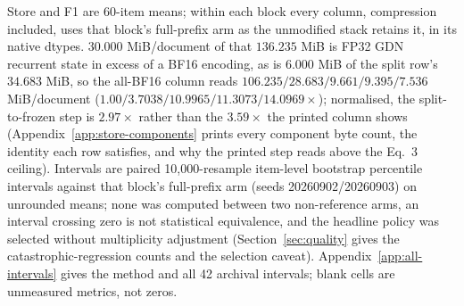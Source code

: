 \begin{table}[t]
\parbox{0.97\textwidth}{\scriptsize Store and F1 are 60-item means; within each block every column,
compression included, uses that block's full-prefix arm as the unmodified stack
retains it, in its native dtypes. $30.000$ MiB/document of that
$136.235$ MiB is FP32 GDN recurrent state in excess of a BF16 encoding, as is
$6.000$ MiB of the split row's $34.683$ MiB, so the all-BF16 column reads
$106.235/28.683/9.661/9.395/7.536$ MiB/document
($1.00/3.7038/10.9965/11.3073/14.0969\times$); normalised, the split-to-frozen
step is $2.97\times$ rather than the $3.59\times$ the printed column shows
(Appendix~\ref{app:store-components} prints every component byte count, the
identity each row satisfies, and why the printed step reads above the Eq.~3
ceiling). Intervals are paired 10,000-resample item-level
bootstrap percentile intervals against that block's full-prefix arm (seeds
20260902/20260903) on unrounded means; none was computed between two
non-reference arms, an interval crossing zero is not statistical equivalence,
and the headline policy was selected without multiplicity adjustment
(Section~\ref{sec:quality} gives the catastrophic-regression counts and the
selection caveat). Appendix~\ref{app:all-intervals} gives the method and all 42
archival intervals; blank cells are unmeasured metrics, not zeros.}
\end{table}
